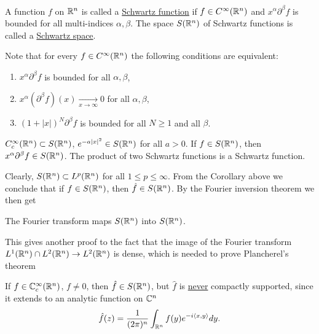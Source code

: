 \begin{definition}
    A function $f$ on $\mathbb{R}^n$ is called a \underline{Schwartz function} if $f\in C^\infty(\mathbb{R}^n)$ and $x^\alpha \partial^\beta f$ is bounded for all multi-indices $\alpha,\beta$. The space $S(\mathbb{R}^n)$ of 
    Schwartz functions is called a \underline{Schwartz space}.

    Note that for every $f\in C^\infty(\mathbb{R}^n)$ the following conditions are equivalent: 
    \begin{enumerate}
        \item $x^\alpha \partial^\beta f$ is bounded for all $\alpha,\beta$,
        \item $x^\alpha (\partial^\beta f)(x)\xrightarrow[x\rightarrow \infty]{}0$ for all $\alpha,\beta$,
        \item $(1+|x|)^N\partial^\beta f$ is bounded for all $N\geq 1$ and all $\beta$.
    \end{enumerate}
\end{definition}

\begin{example}
    $C^\infty_c(\mathbb{R}^n)\subset S(\mathbb{R}^n)$, $e^{-a|x|^2}\in S(\mathbb{R}^n)$ for all $a>0$. If $f\in S(\mathbb{R}^n)$, then $x^\alpha\partial^\beta f\in S(\mathbb{R}^n)$. The product of two 
    Schwartz functions is a Schwartz function.
\end{example}
Clearly, $S(\mathbb{R}^n)\subset L^p(\mathbb{R}^n)$ for all $1\leq p\leq \infty$. From the Corollary above we conclude that if $f\in S(\mathbb{R}^n)$, then $\hat f\in S(\mathbb{R}^n)$. By the Fourier inversion theorem we then get

\begin{theorem}
    The Fourier transform maps $S(\mathbb{R}^n)$ into $S(\mathbb{R}^n)$.
\end{theorem}

\begin{remark}
    This gives another proof to the fact that the image of the Fourier transform $ L^1(\mathbb{R}^n)\cap L^2(\mathbb{R}^n)\rightarrow L^2(\mathbb{R}^n)$ is dense, which is needed to prove Plancherel's theorem
\end{remark}

\begin{remark}
    If $f\in\mathbb{C}_c^\infty(\mathbb{R}^n)$, $f\neq 0$, then $\hat f\in S(\mathbb{R}^n)$, but $\hat f$ is \underline{never} compactly supported, since it extends to an analytic function on $\mathbb{C}^n$
    \[\hat f(z)=\frac{1}{(2\pi)^n}\int_{\mathbb{R}^n} f(y)e^{-i\langle x,y\rangle}dy.\]
\end{remark}